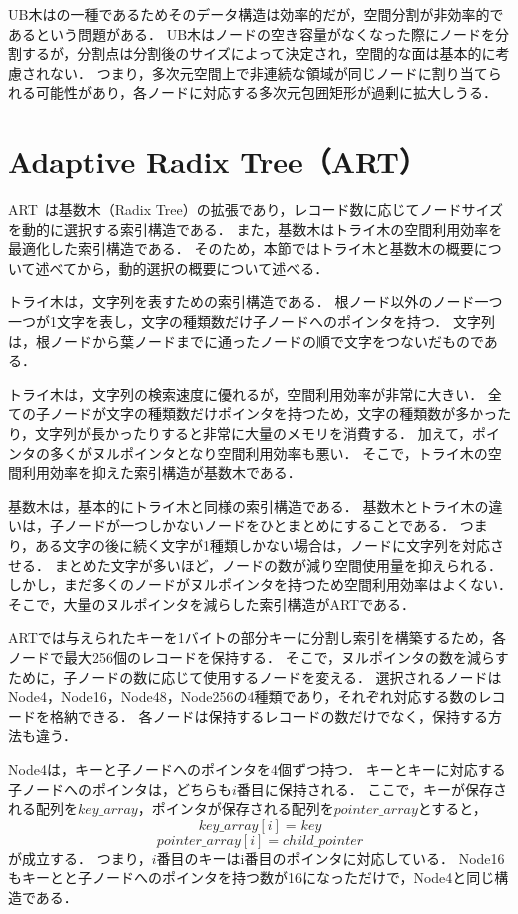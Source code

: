 UB木は\BTree の一種であるためそのデータ構造は効率的だが，空間分割が非効率的であるという問題がある．
UB木はノードの空き容量がなくなった際にノードを分割するが，分割点は分割後のサイズによって決定され，空間的な面は基本的に考慮されない．
つまり，多次元空間上で非連続な領域が同じノードに割り当てられる可能性があり，各ノードに対応する多次元包囲矩形が過剰に拡大しうる．

\section{Adaptive Radix Tree（ART）}

ART~\cite{icde:Leis2013}は基数木（Radix Tree）の拡張であり，レコード数に応じてノードサイズを動的に選択する索引構造である．
また，基数木はトライ木の空間利用効率を最適化した索引構造である．
そのため，本節ではトライ木と基数木の概要について述べてから，動的選択の概要について述べる．

トライ木は，文字列を表すための索引構造である．
根ノード以外のノード一つ一つが1文字を表し，文字の種類数だけ子ノードへのポインタを持つ．
文字列は，根ノードから葉ノードまでに通ったノードの順で文字をつないだものである．

トライ木は，文字列の検索速度に優れるが，空間利用効率が非常に大きい．
全ての子ノードが文字の種類数だけポインタを持つため，文字の種類数が多かったり，文字列が長かったりすると非常に大量のメモリを消費する．
加えて，ポインタの多くがヌルポインタとなり空間利用効率も悪い．
そこで，トライ木の空間利用効率を抑えた索引構造が基数木である．

基数木は，基本的にトライ木と同様の索引構造である．
基数木とトライ木の違いは，子ノードが一つしかないノードをひとまとめにすることである．
つまり，ある文字の後に続く文字が1種類しかない場合は，ノードに文字列を対応させる．
まとめた文字が多いほど，ノードの数が減り空間使用量を抑えられる．
しかし，まだ多くのノードがヌルポインタを持つため空間利用効率はよくない．
そこで，大量のヌルポインタを減らした索引構造がARTである．

ARTでは与えられたキーを1バイトの部分キーに分割し索引を構築するため，各ノードで最大256個のレコードを保持する．
そこで，ヌルポインタの数を減らすために，子ノードの数に応じて使用するノードを変える．
選択されるノードはNode4，Node16，Node48，Node256の4種類であり，それぞれ対応する数のレコードを格納できる．
各ノードは保持するレコードの数だけでなく，保持する方法も違う．

Node4は，キーと子ノードへのポインタを4個ずつ持つ．
キーとキーに対応する子ノードへのポインタは，どちらも$i$番目に保持される．
ここで，キーが保存される配列を$key\_array$，ポインタが保存される配列を$pointer\_array$とすると，
\[key\_array[i]=key\]
\[pointer\_array[i]=child\_pointer\]
が成立する．
つまり，$i$番目のキーはi番目のポインタに対応している．
Node16もキーとと子ノードへのポインタを持つ数が16になっただけで，Node4と同じ構造である．


